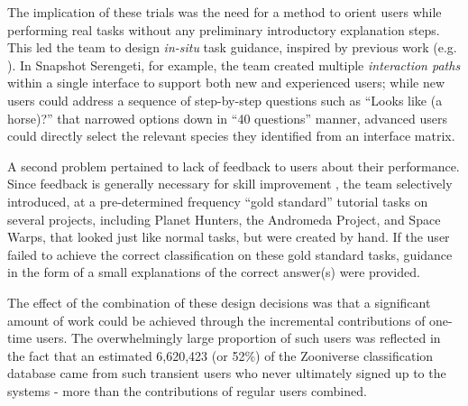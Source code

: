 \documentclass{sigchi}
\begin{document}


The implication of these trials was the need for a method to orient users while performing real tasks without any preliminary introductory explanation steps. This led the team to design \emph{in-situ} task guidance, inspired by previous work (e.g. \cite{ockerman2000review}).  In Snapshot Serengeti, for example, the team created multiple \emph{interaction paths} within a single interface to support both new and experienced users; while new users could address a sequence of step-by-step questions such as ``Looks like (a horse)?'' that narrowed options down in ``40 questions'' manner, advanced users could directly select the relevant species they identified from an interface matrix.  

A second problem pertained to lack of feedback to users about their performance.  Since feedback is generally necessary for skill improvement \cite{kluger1996effects}, the team selectively introduced, at a pre-determined frequency ``gold standard''  tutorial tasks on several projects, including Planet Hunters, the Andromeda Project, and Space Warps, that looked just like normal tasks, but were created by hand.  If the user failed to achieve the correct classification on these gold standard tasks, guidance in the form of a small explanations of the correct answer(s) were provided.   

The effect of the combination of these design decisions was that a significant amount of work could be achieved through the incremental contributions of one-time users.  The overwhelmingly large proportion of such users was reflected in the fact that an estimated 6,620,423 (or 52\%) of the Zooniverse classification database came from such transient users who never ultimately signed up to the systems - more than the contributions of regular users combined.  %
\end{document}

